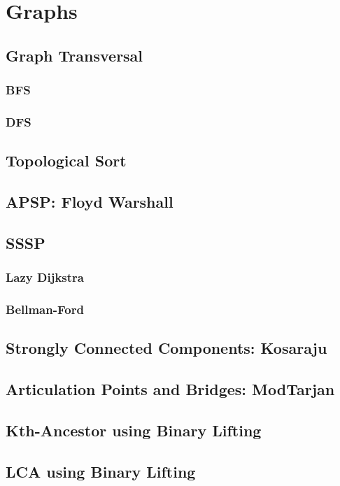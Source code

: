 \section{Graphs}
\subsection{Graph Transversal}
\subsubsection{BFS}
\subsubsection{DFS}
\subsection{Topological Sort}
\subsection{APSP: Floyd Warshall}
\subsection{SSSP}
\subsubsection{Lazy Dijkstra}
\subsubsection{Bellman-Ford}
\subsection{Strongly Connected Components: Kosaraju}
\subsection{Articulation Points and Bridges: ModTarjan}
\subsection{Kth-Ancestor using Binary Lifting}
\subsection{LCA using Binary Lifting}

